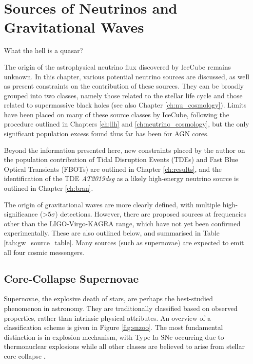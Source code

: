 \setchapterpreamble[u]{\margintoc}
\chapter{Sources of Neutrinos and Gravitational Waves}

\begin{fquote} What the hell is a quasar?
\end{fquote}


The origin of the astrophysical neutrino flux discovered by IceCube remains unknown. In this chapter, various potential neutrino sources are discussed, as well as present constraints on the contribution of these sources. They can be broadly grouped into two classes, namely those related to the stellar life cycle and those related to supermassive black holes (see also Chapter \ref{ch:nu_cosmology}). Limits have been placed on many of these source classes by IceCube, following the procedure outlined in Chapters \ref{ch:llh} and \ref{ch:neutrino_cosmology}, but the only significant population excess found thus far has been for AGN cores.

Beyond the information presented here, new constraints placed by the author on the population contribution of Tidal Disruption Events (TDEs) and Fast Blue Optical Transients (FBOTs) are outlined in Chapter \ref{ch:results}, and the identification of the TDE \emph{AT2019dsg} as a likely high-energy neutrino source is outlined in Chapter \ref{ch:bran}.  

The origin of gravitational waves are more clearly defined, with multiple high-significance (>5$\sigma$) detections. However, there are proposed sources at frequencies other than the LIGO-Virgo-KAGRA range, which have not yet been confirmed experimentally. These are also outlined below, and summarised in Table \ref{tab:gw_source_table}. Many sources (such as supernovae) are expected to emit all four cosmic messengers.

\section{Core-Collapse Supernovae}
\label{sec:ccsn}

Supernovae, the explosive death of stars, are perhaps the best-studied phenomenon in astronomy. They are traditionally classified based on observed properties, rather than intrinsic physical attributes. An overview of a classification scheme is given in Figure \ref{fig:snzoo}. The most fundamental distinction is in explosion mechanism, with Type Ia SNe occurring due to thermonuclear explosions while all other classes are believed to arise from stellar core collapse . 

